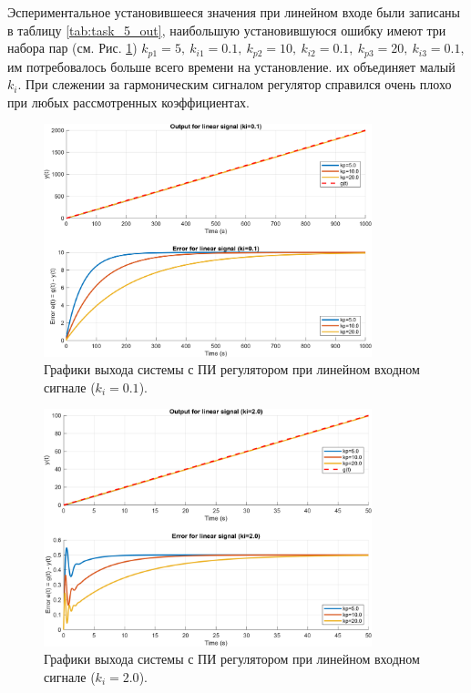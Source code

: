 Эспериментальное установившееся значения при линейном входе были записаны в таблицу \ref{tab:task_5_out}, наибольшую установившуюся ошибку
имеют три набора пар (см. Рис. \ref{fig:task_5_out_linear_ki0.1}) $k_{p1}=5,\ k_{i1}=0.1,\ k_{p2}=10,\ k_{i2}=0.1,\ k_{p3}=20,\ k_{i3}=0.1$,
им потребовалось больше всего времени на установление.
их объединяет малый $k_i$. При слежении за гармоническим сигналом регулятор справился очень плохо
при любых рассмотренных коэффициентах.

\begin{figure}[H]
    \centering
    \includegraphics[width=0.85\textwidth]{figs/task_5_out_linear_ki0.1.png}
    \caption{Графики выхода системы с ПИ регулятором при линейном входном сигнале (\( k_i = 0.1 \)).}
    \label{fig:task_5_out_linear_ki0.1}
\end{figure}

\begin{figure}[H]
    \centering
    \includegraphics[width=0.85\textwidth]{figs/task_5_out_linear_ki2.0.png}
    \caption{Графики выхода системы с ПИ регулятором при линейном входном сигнале (\( k_i = 2.0 \)).}
    \label{fig:task_5_out_linear_ki2.0}
\end{figure}

